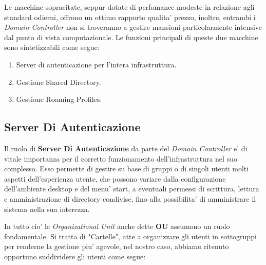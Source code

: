 \documentclass{report}
\begin{document}
        Le macchine sopracitate, seppur dotate di perfomance modeste in relazione agli standard odierni, offrono un ottimo 
         rapporto qualita' prezzo, inoltre, entrambi i \emph{Domain Controller} non si troveranno a gestire mansioni 
         particolarmente intensive dal punto di vista computazionale.
        Le funzioni principali di queste due macchine sono sintetizzabili come segue:
        \begin{enumerate}
            \item Server di autenticazione per l'intera infrastruttura.
            \item Gestione Shared Directory.
            \item Gestione Roaming Profiles.
        \end{enumerate}
            \subsection{Server Di Autenticazione}
            Il ruolo di \textbf{Server Di Autenticazione} da parte del \emph{Domain Controller} e' di vitale importanza
             per il corretto funzionamento dell'infrastruttura nel suo complesso. Esso permette di gestire su base di 
             gruppi o di singoli utenti molti aspetti dell'esperienza utente, che possono variare dalla configurazione
             dell'ambiente desktop e del menu' start, a eventuali permessi di scrittura, lettura e amministrazione di
             directory condivise, fino alla possibilita' di amministrare il sistema nella sua interezza.
            
            In tutto cio' le \emph{Organizational Unit} anche dette \textbf{OU} assumono un ruolo fondamentale. Si 
             tratta di "Cartelle", atte a organizzare gli utenti in sottogruppi per renderne la gestione piu' agevole,
             nel nostro caso, abbiamo ritenuto opportuno suddividere gli utenti come segue:
\end{document}
